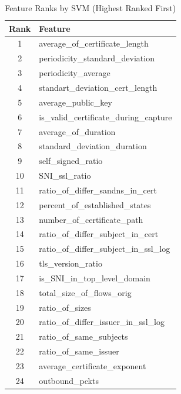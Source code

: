 \begin{table}[!htb]
	\caption{Feature Ranks by SVM (Highest Ranked First) \label{tab:5}}
	\begin{center}
		\begin{tabular}{c|p{}}\hline\hline
			Rank & Feature  \\ \hline
			 1  & average\_of\_certificate\_length           \\
			 2  & periodicity\_standard\_deviation           \\
			 3  & periodicity\_average                       \\
			 4  & standart\_deviation\_cert\_length          \\
			 5  & average\_public\_key                       \\
			 6  & is\_valid\_certificate\_during\_capture    \\
			 7  & average\_of\_duration                      \\
			 8  & standard\_deviation\_duration              \\
			 9  & self\_signed\_ratio                        \\
			 10 & SNI\_ssl\_ratio                            \\
			 11 & ratio\_of\_differ\_sandns\_in\_cert        \\
			 12 & percent\_of\_established\_states           \\
			 13 & number\_of\_certificate\_path              \\
			 14 & ratio\_of\_differ\_subject\_in\_cert       \\
			 15 & ratio\_of\_differ\_subject\_in\_ssl\_log   \\
			 16 & tls\_version\_ratio                        \\
			 17 & is\_SNI\_in\_top\_level\_domain            \\
			 18 & total\_size\_of\_flows\_orig               \\
			 19 & ratio\_of\_sizes                           \\
			 20 & ratio\_of\_differ\_issuer\_in\_ssl\_log    \\
			 21 & ratio\_of\_same\_subjects                  \\
			 22 & ratio\_of\_same\_issuer                    \\
			 23 & average\_certificate\_exponent             \\
			 24 & outbound\_pckts                            \\

\end{tabular}
\end{center}
\end{table}
